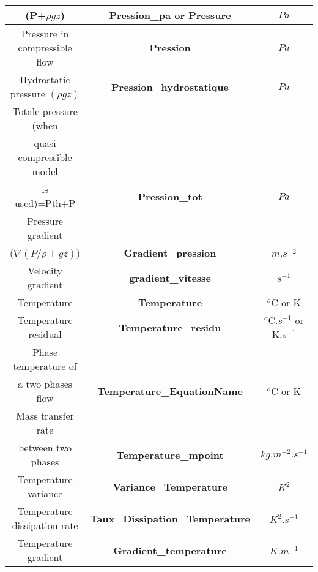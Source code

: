 \begin{longtable}[hcr]{|c|c|c|}
(P+$\rho gz$)                                   & \textbf{Pression\_pa} or \textbf{Pressure}         & $Pa$ \\ \hline
Pressure in compressible flow                   & \textbf{Pression}                         & $Pa$ \\ \hline
Hydrostatic pressure $(\rho g z)$               & \textbf{Pression\_hydrostatique}          & $Pa$ \\ \hline
Totale pressure (when                           &                                           & \\
quasi compressible model                        &                                           & \\
is used)=Pth+P                                  & \textbf{Pression\_tot}                    & $Pa$ \\ \hline
Pressure gradient                               &                                           & \\
($\nabla(P/\rho+gz)$)                           & \textbf{Gradient\_pression}               & $m.s^{-2}$ \\ \hline
Velocity gradient                               & \textbf{gradient\_vitesse}                & $s^{-1}$ \\ \hline
Temperature                                     & \textbf{Temperature}                      & $^o$C or K \\ \hline
Temperature residual                            & \textbf{Temperature\_residu}              & $^o$C.$s^{-1}$ or K.$s^{-1}$ \\ \hline
Phase temperature of                            &                                           & \\
a two phases flow                               & \textbf{Temperature\_EquationName}        & $^o$C or K \\ \hline
Mass transfer rate                              &                                           & \\
between two phases                              & \textbf{Temperature\_mpoint}              & $kg.m^{-2}.s^{-1}$ \\ \hline
Temperature variance                            & \textbf{Variance\_Temperature}            & $K^2$ \\ \hline
Temperature dissipation rate                    & \textbf{Taux\_Dissipation\_Temperature}   & $K^2.s^{-1}$ \\ \hline
Temperature gradient                            & \textbf{Gradient\_temperature}            & $K.m^{-1}$ \\ \hline

\end{longtable}
